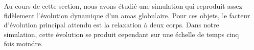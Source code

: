 



		Au cours de cette section, nous avons étudié une simulation qui reproduit assez fidèlement l'évolution dynamique d'un amas globulaire.
		Pour ces objets, le facteur d'évolution principal attendu est la relaxation à deux corps. Dans notre simulation, cette évolution se produit
		cependant sur une échelle de temps cinq fois moindre.

